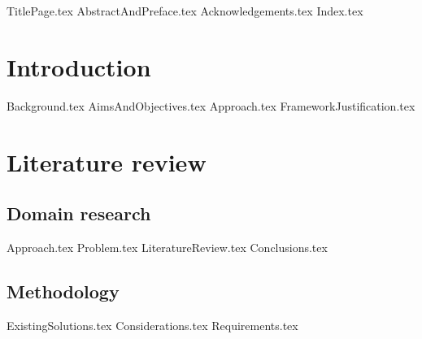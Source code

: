 \documentclass{article} %
\begin{document}

{TitlePage.tex}
{AbstractAndPreface.tex}
{Acknowledgements.tex}
{Index.tex}

\newpage
\section{Introduction}
{Background.tex}
{AimsAndObjectives.tex}
{Approach.tex}
{FrameworkJustification.tex}

\newpage
\section{Literature review}
\subsection{Domain research}
{Approach.tex}
{Problem.tex}
{LiteratureReview.tex}
{Conclusions.tex}

\subsection{Methodology}
{ExistingSolutions.tex}
{Considerations.tex}
{Requirements.tex}
\end{document}
